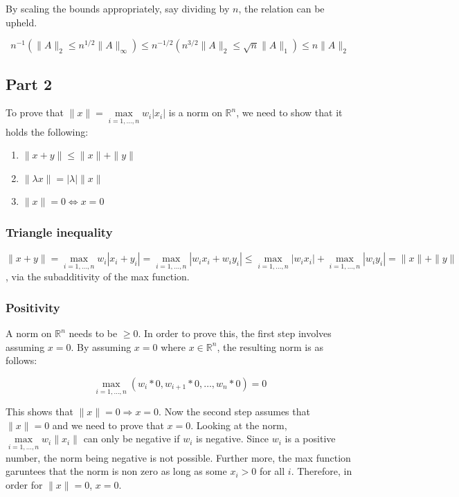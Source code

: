 \documentclass{report}
\begin{document}
\noindent By scaling the bounds appropriately, say dividing by $n$, the relation can be upheld.

$$n^{-1}(\|A\|_2 \leq n^{1/2} \|A\|_{\infty}) \leq n^{-1/2}(n^{3/2}\|A\|_{2} \leq \sqrt{n} \|A\|_{1}) \leq n\|A\|_2$$ 

\subsection*{Part 2}

To prove that $\|x\| = \max\limits_{i=1,\dots,n}w_i|x_i|$ is a norm on $\mathbb{R}^n$, we need to show that it holds
the following:
\begin{enumerate}
    \item $\|x+y\| \leq \|x\| + \|y\|$
    \item $\|\lambda x\| = |\lambda|\|x\|$
    \item $\|x\| = 0 \iff x = 0$
\end{enumerate}

\subsubsection*{Triangle inequality}

$\|x+y\|=\max\limits_{i=1,\dots,n} w_i|x_i + y_i| = \max\limits_{i=1,\dots,n} |w_ix_i + w_iy_i| \leq \max\limits_{i=1,\dots,n} |w_ix_i| + \max\limits_{i=1,\dots,n} |w_iy_i| = \|x\| + \|y\|$
, via the subadditivity of the max function.

\subsubsection*{Positivity}

A norm on $\mathbb{R}^n$ needs to be $\geq 0$. In order to prove this, the first step involves assuming $x=0$. 
By assuming $x=0$ where $x\in\mathbb{R}^n$, the resulting norm is as follows:

$$\max\limits_{i=1,\dots,n} (w_i * 0, w_{i+1} * 0, \dots, w_n * 0) = 0$$

\noindent This shows that $\|x\|=0 \Longrightarrow x=0$. Now the second step assumes that $\|x\|=0$ and we need to prove that $x=0$.
Looking at the norm, $\max\limits_{i=1,\dots,n} w_i\|x_i\|$ can only be negative if $w_i$ is negative. Since $w_i$ is a positive
number, the norm being negative is not possible. Further more, the max function garuntees that the norm is non zero as long as some
$x_i>0$ for all $i$. Therefore, in order for $\|x\|=0$, $x=0$.
\end{document}
